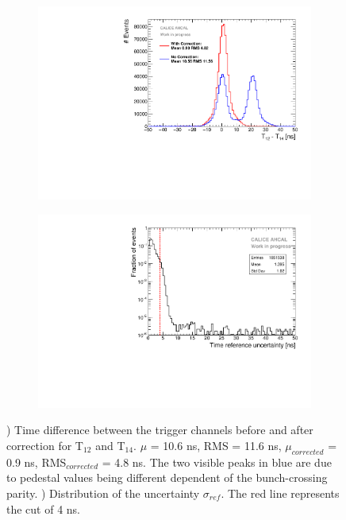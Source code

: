 \documentclass{JINST}
\begin{document}
\begin{figure}[htbp!]
  \begin{subfigure}[t]{0.49\textwidth}
    \centering
    \includegraphics[width=1\linewidth]{fig/T0_Resolution_5.pdf}
    \caption{} \label{fig:T0Corr}
  \end{subfigure}
  \hfill
  \begin{subfigure}[t]{0.49\textwidth}
    \centering
    \includegraphics[width=1\linewidth]{fig/T0ReferenceError.pdf}
    \caption{} \label{fig:TRefErr}
  \end{subfigure}
  \caption{) Time difference between the trigger channels before and after correction for T$_{12}$ and T$_{14}$. $\mu$ = 10.6 ns, RMS = 11.6 ns, $\mu_{corrected}$ = 0.9 ns, RMS$_{corrected}$ = 4.8 ns. The two visible peaks in blue are due to pedestal values being different dependent of the bunch-crossing parity. ) Distribution of the uncertainty $\sigma_{ref}$. The red line represents the cut of 4 ns.}
\end{figure}
\end{document}
